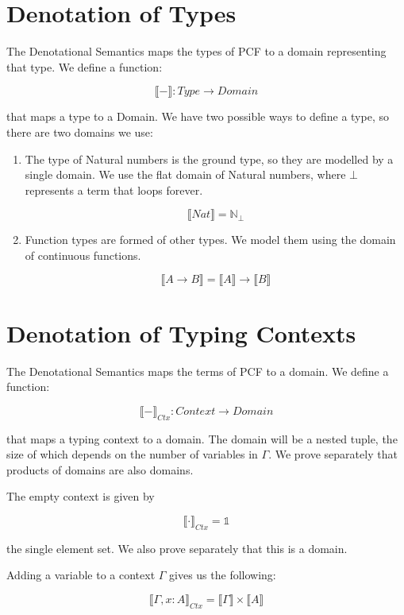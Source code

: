 \section{Denotation of Types}

The Denotational Semantics maps the types of PCF to a domain representing that type. We define a function:

\[\llbracket - \rrbracket : Type \to Domain \]

that maps a type to a Domain. We have two possible ways to define a type, so there are two domains we use:

\begin{enumerate}
\item{The type of Natural numbers is the ground type, so they are modelled by a single domain. We use the flat domain of Natural numbers, where $\bot$ represents a term that loops forever.

\[ \llbracket Nat \rrbracket = \mathbb{N}_{\bot} \]

}
\item{Function types are formed of other types. We model them using the domain of continuous functions.

\[\llbracket A \to B \rrbracket = \llbracket A \rrbracket \to \llbracket B \rrbracket \]

}
\end{enumerate}

\section{Denotation of Typing Contexts}
The Denotational Semantics maps the terms of PCF to a domain. We define a function:

\[ \llbracket - \rrbracket_{Ctx} : Context \to Domain \]

that maps a typing context to a domain. The domain will be a nested tuple, the size of which depends on the number of variables in $\Gamma$. We prove separately that products of domains are also domains. 

The empty context is given by 

\[\llbracket \cdot \rrbracket_{Ctx} = \mathbb{1}\]

the single element set. We also prove separately that this is a domain. 

Adding a variable to a context $\Gamma$ gives us the following:

\[ \llbracket \Gamma, x : A \rrbracket_{Ctx} = \llbracket \Gamma \rrbracket \times \llbracket A \rrbracket \]

